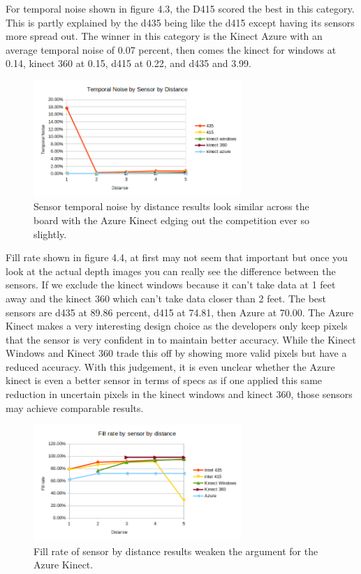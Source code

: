 For temporal noise shown in figure 4.3, the D415 scored the best in this category. This is partly explained by the d435 being like the d415 except having its sensors more spread out. The winner in this category is the Kinect Azure with an average temporal noise of 0.07 percent, then comes the kinect for windows at 0.14, kinect 360 at 0.15, d415 at 0.22, and d435 and 3.99.
\begin{figure}[!htb]
	\caption{Sensor temporal noise by distance results look similar across the board with the Azure Kinect edging out the competition ever so slightly.}
	\centering
	\includegraphics[width=0.7\textwidth]{images/temporal_noise.png}
\end{figure}

Fill rate shown in figure 4.4, at first may not seem that important but once you look at the actual depth images you can really see the difference between the sensors. If we exclude the kinect windows because it can't take data at 1 feet away and the kinect 360 which can't take data closer than 2 feet. The best sensors are d435 at 89.86 percent, d415 at 74.81, then Azure at 70.00. The Azure Kinect makes a very interesting design choice as the developers only keep pixels that the sensor is very confident in to maintain better accuracy. While the Kinect Windows and Kinect 360 trade this off by showing more valid pixels but have a reduced accuracy. With this judgement, it is even unclear whether the Azure kinect is even a better sensor in terms of specs as if one applied this same reduction in uncertain pixels in the kinect windows and kinect 360, those sensors may achieve comparable results.

\begin{figure}[!htb]
	\caption{Fill rate of sensor by distance results weaken the argument for the Azure Kinect.}
	\centering
	\includegraphics[width=0.7\textwidth]{images/fill_rate.png}
\end{figure}

